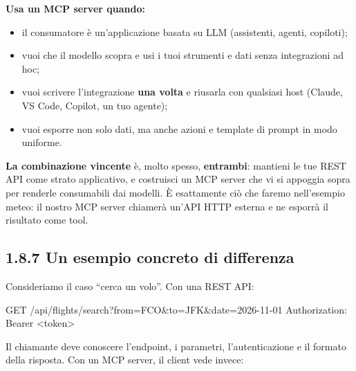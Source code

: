 \documentclass[
  italian,
  10pt,
]{book}
\newenvironment{Shaded}{\begin{snugshade}}{\end{snugshade}}
\newcommand{\NormalTok}[1]{#1}
\providecommand{\tightlist}{%
  \setlength{\itemsep}{0pt}\setlength{\parskip}{0pt}}
\begin{document}
\textbf{Usa un MCP server quando:}

\begin{itemize}
\tightlist
\item
  il consumatore è un'applicazione basata su LLM (assistenti, agenti,
  copiloti);
\item
  vuoi che il modello scopra e usi i tuoi strumenti e dati senza
  integrazioni ad hoc;
\item
  vuoi scrivere l'integrazione \textbf{una volta} e riusarla con
  qualsiasi host (Claude, VS Code, Copilot, un tuo agente);
\item
  vuoi esporre non solo dati, ma anche azioni e template di prompt in
  modo uniforme.
\end{itemize}

\textbf{La combinazione vincente} è, molto spesso, \textbf{entrambi}:
mantieni le tue REST API come strato applicativo, e costruisci un MCP
server che vi si appoggia sopra per renderle consumabili dai modelli. È
esattamente ciò che faremo nell'esempio meteo: il nostro MCP server
chiamerà un'API HTTP esterna e ne esporrà il risultato come tool.

\subsection{1.8.7 Un esempio concreto di
differenza}\label{un-esempio-concreto-di-differenza}

Consideriamo il caso ``cerca un volo''. Con una REST API:

\begin{Shaded}
\begin{Highlighting}[]
\NormalTok{GET /api/flights/search?from=FCO\&to=JFK\&date=2026{-}11{-}01}
\NormalTok{Authorization: Bearer \textless{}token\textgreater{}}
\end{Highlighting}
\end{Shaded}

Il chiamante deve conoscere l'endpoint, i parametri, l'autenticazione e
il formato della risposta. Con un MCP server, il client vede invece:
\end{document}
